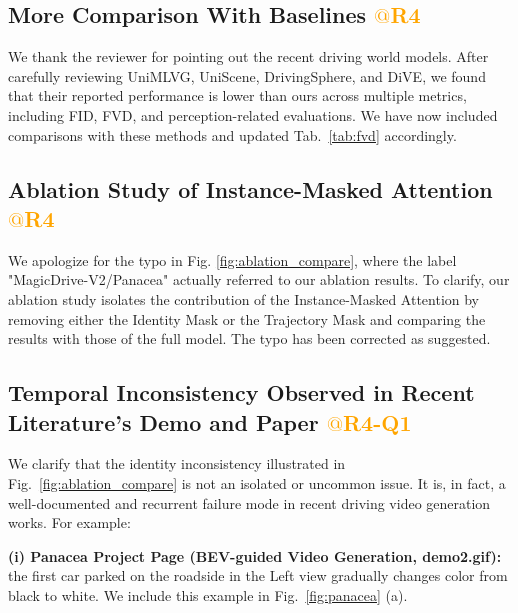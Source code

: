 \subsection{More Comparison With Baselines \textcolor{orange}{$@$R4}}

We thank the reviewer for pointing out the recent driving world models. 
After carefully reviewing UniMLVG\cite{chen2025unimlvgunifiedframeworkmultiview}, UniScene\cite{li2025unisceneunifiedoccupancycentricdriving}, DrivingSphere\cite{yan2024drivingspherebuildinghighfidelity4d}, and DiVE\cite{jiang2024diveditbasedvideogeneration}, we found that their reported performance is lower than ours across multiple metrics, including FID, FVD, and perception-related evaluations. 
We have now included comparisons with these methods and updated Tab.~\ref{tab:fvd} accordingly.




\subsection{Ablation Study of Instance-Masked Attention \textcolor{orange}{$@$R4}}

We apologize for the typo in Fig. \ref{fig:ablation_compare}, where the label "MagicDrive-V2/Panacea" actually referred to our ablation results. 
To clarify, our ablation study isolates the contribution of the Instance-Masked Attention by removing either the Identity Mask or the Trajectory Mask and comparing the results with those of the full model. The typo has been corrected as suggested.





\subsection{Temporal Inconsistency Observed in Recent Literature's Demo and Paper \textcolor{orange}{$@$R4-Q1}}

We clarify that the identity inconsistency illustrated in Fig.~\ref{fig:ablation_compare} is not an isolated or uncommon issue. It is, in fact, a well-documented and recurrent failure mode in recent driving video generation works. For example:

\textbf{(i) Panacea Project Page (BEV-guided Video Generation, demo2.gif):}
the first car parked on the roadside in the Left view gradually changes color from black to white.
We include this example in Fig.~\ref{fig:panacea} (a).%


